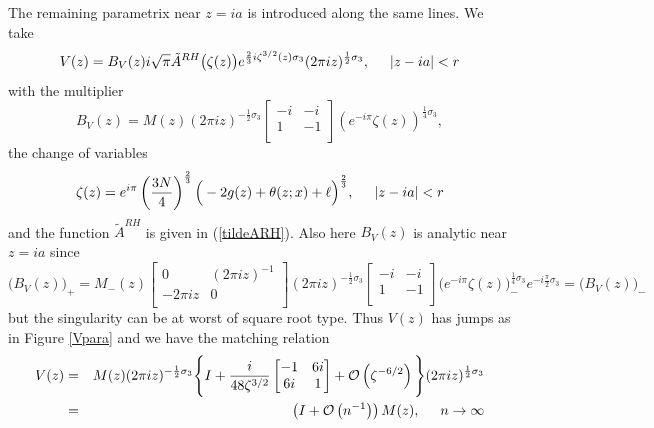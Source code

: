 \documentclass[10pt,oneside,reqno]{amsart}
\numberwithin{equation}{section}
\def\eqref#1{(\ref{#1})}
\begin{document}
The remaining parametrix near $z=ia$ is introduced along the same lines. We take
\begin{equation}\label{apara}
  V(z) = B_V(z)i\sqrt{\pi}\tilde{A}^{RH}\big(\zeta(z)\big)e^{\frac{2}{3}i\zeta^{3/2}(z)\sigma_3}(2\pi iz)^{\frac{1}{2}\sigma_3},
  \hspace{0.5cm}|z-ia|<r
\end{equation}
with the multiplier
\begin{equation*}
  B_V(z)=M(z)(2\pi iz)^{-\frac{1}{2}\sigma_3}\begin{bmatrix}
                                                        -i & -i\\
1 & -1\\
                                                       \end{bmatrix}\left(e^{-i\pi}\zeta(z)\right)^{\frac{1}{4}\sigma_3},
\end{equation*}
the change of variables
\begin{equation*}
  \zeta(z) = e^{i\pi}\left(\frac{3N}{4}\right)^{\frac{2}{3}}\Big(-2g(z)+\theta(z;x)+\ell\Big)^{\frac{2}{3}},\hspace{0.5cm}|z-ia|<r
\end{equation*}
and the function $\tilde{A}^{RH}$ is given in \eqref{tildeARH}. Also here $B_V(z)$ is analytic near $z=ia$ since
\begin{equation*}
  \big(B_V(z)\big)_+ = M_-(z)\begin{bmatrix}
                                          0 & (2\pi iz)^{-1}\\
-2\pi iz& 0\\
                                         \end{bmatrix}(2\pi iz)^{-\frac{1}{2}\sigma_3}\begin{bmatrix}
-i & -i\\
1 & -1\\
\end{bmatrix}\big(e^{-i\pi}\zeta(z)\big)^{\frac{1}{4}\sigma_3}_-e^{-i\frac{\pi}{2}\sigma_3} = \big(B_V(z)\big)_-
\end{equation*}
but the singularity can be at worst of square root type. Thus $V(z)$ has jumps as in Figure \ref{Vpara} and we have the matching relation
\begin{eqnarray}
  V(z)&=&M(z)(2\pi iz)^{-\frac{1}{2}\sigma_3}\Bigg\{I+\frac{i}{48\zeta^{3/2}}\begin{bmatrix}
	-1 & 6i\\
	6i & 1\\
	\end{bmatrix}+\mathcal O\left(\zeta^{-6/2}\right)\Bigg\}(2\pi iz)^{\frac{1}{2}\sigma_3}\nonumber\\
&=&\left(I+\mathcal O\left(n^{-1}\right)\right)M(z),\hspace{0.5cm}n\rightarrow\infty\label{match2}
\end{eqnarray}
\end{document}
